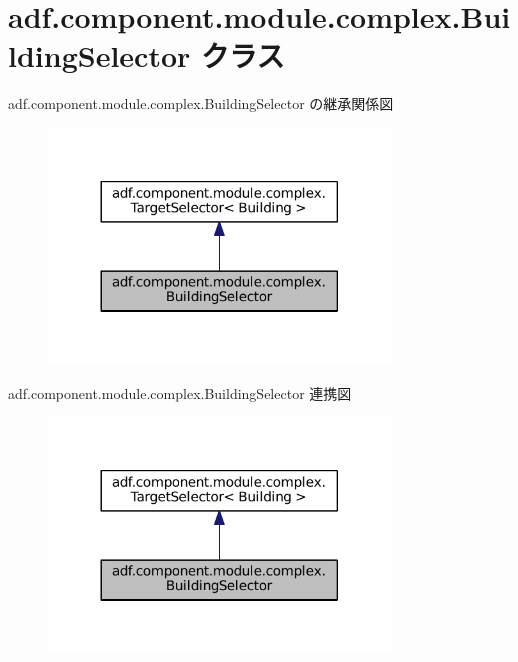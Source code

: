 \hypertarget{classadf_1_1component_1_1module_1_1complex_1_1BuildingSelector}{}\section{adf.\+component.\+module.\+complex.\+Building\+Selector クラス}
\label{classadf_1_1component_1_1module_1_1complex_1_1BuildingSelector}


adf.\+component.\+module.\+complex.\+Building\+Selector の継承関係図
\nopagebreak
\begin{figure}[H]
\begin{center}
\leavevmode
\includegraphics[width=257pt]{classadf_1_1component_1_1module_1_1complex_1_1BuildingSelector__inherit__graph}
\end{center}
\end{figure}


adf.\+component.\+module.\+complex.\+Building\+Selector 連携図
\nopagebreak
\begin{figure}[H]
\begin{center}
\leavevmode
\includegraphics[width=257pt]{classadf_1_1component_1_1module_1_1complex_1_1BuildingSelector__coll__graph}
\end{center}
\end{figure}
